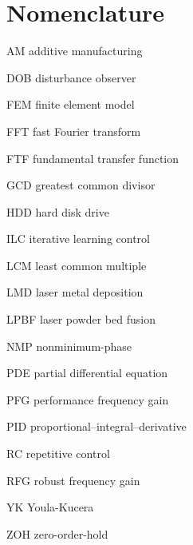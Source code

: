 \documentclass [11pt, proquest] {uwthesis}[2020/02/24]
\begin{document}
%
%
\chapter*{Nomenclature}      %
\thispagestyle{plain}
%
\begin{glossary}
\item[AM] additive manufacturing
\item[DOB] disturbance observer
\item[FEM] finite element model
\item[FFT] fast Fourier transform
\item[FTF] fundamental transfer function
\item[GCD] greatest common divisor
\item[HDD] hard disk drive
\item[ILC] iterative learning control
\item[LCM] least common multiple
\item[LMD] laser metal deposition
\item[LPBF] laser powder bed fusion
\item[NMP] nonminimum-phase
\item[PDE] partial differential equation 
\item[PFG] performance frequency gain
\item[PID] proportional–integral–derivative
\item[RC] repetitive control
\item[RFG] robust frequency gain
\item[YK] Youla-Kucera
\item[ZOH] zero-order-hold
\end{glossary}
 
\end{document}
